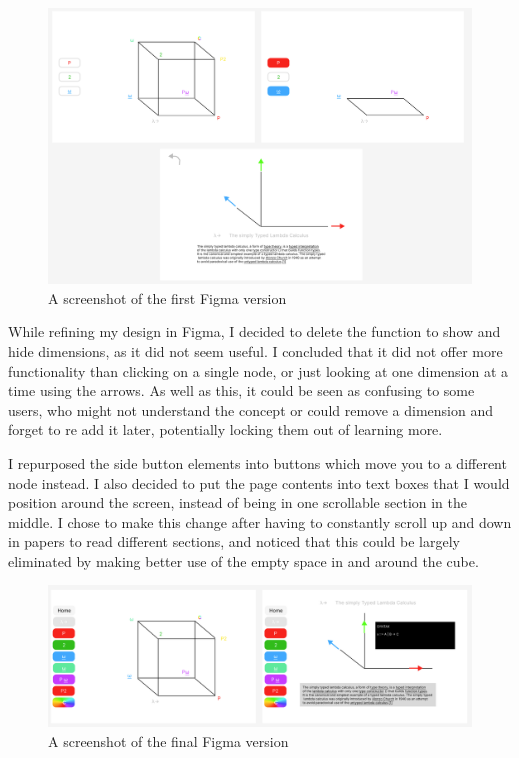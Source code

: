 \documentclass{l4proj}
\begin{document}
\begin{figure}[h!]
    \centering
    \includegraphics[width=1\linewidth]{dissertation/images/v1_full_taller.png}
    \caption{A screenshot of the first Figma version}
    \label{fig:enter-label}
\end{figure}

While refining my design in Figma, I decided to delete the function to show and hide dimensions, as it did not seem useful.  I concluded that it did not offer more functionality than clicking on a single node, or just looking at one dimension at a time using the arrows.  As well as this, it could be seen as confusing to some users, who might not understand the concept or could remove a dimension and forget to re add it later, potentially locking them out of learning more.

I repurposed the side button elements into buttons which move you to a different node instead.  I also decided to put the page contents into text boxes that I would position around the screen, instead of being in one scrollable section in the middle.  I chose to make this change after having to constantly scroll up and down in papers to read different sections, and noticed that this could be largely eliminated by making better use of the empty space in and around the cube.

\begin{figure}[h!]
    \centering
    \includegraphics[width=1\linewidth]{dissertation/images/v2_full.png}
    \caption{A screenshot of the final Figma version}
    \label{fig:enter-label}
\end{figure}
\end{document}

